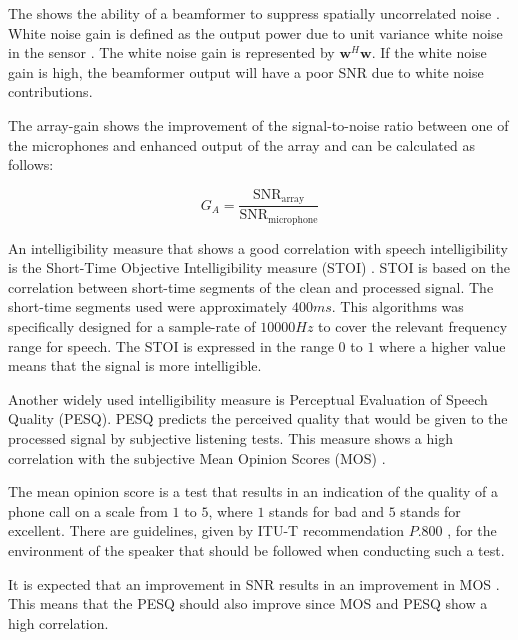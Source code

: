 The shows the ability of a beamformer to suppress spatially uncorrelated noise \cite{brandstein2001}. White noise gain is defined as the output power due to unit variance white noise in the sensor \cite{vanveen1988}.  The white noise gain is represented by $\textbf{w}^H\textbf{w}$. If the white noise gain is high, the beamformer output will have a poor SNR due to white noise contributions. 

The array-gain shows the improvement of the signal-to-noise ratio between one of the microphones and enhanced output of the array and can be calculated as follows:

\begin{equation}
G_{A} = \frac{\text{SNR}_\text{{array}}}{\text{SNR}_\text{microphone}}
\end{equation}


An intelligibility measure that shows a good correlation with speech intelligibility is the Short-Time Objective Intelligibility measure (STOI) \cite{taal2010, taal2011}. STOI is based on the correlation between short-time segments of the clean and processed signal. The short-time segments used were approximately $400 ms$. This algorithms was specifically designed for a sample-rate of $10000 Hz$ to cover the relevant frequency range for speech. The STOI is expressed in the range $0$ to $1$ where a higher value means that the signal is more intelligible.


Another widely used intelligibility measure is Perceptual Evaluation of Speech Quality (PESQ). PESQ predicts the perceived quality that would be given to the processed signal by subjective listening tests. This measure shows a high correlation with the subjective Mean Opinion Scores (MOS) \cite{rix2001, itu2010}.

The mean opinion score is a test that results in an indication of the quality of a phone call on a scale from $1$ to $5$, where $1$ stands for bad and $5$ stands for excellent. There are guidelines, given by ITU-T recommendation $P.800$ \cite{ituquality1998}, for the environment of the speaker that should be followed when conducting such a test.

It is expected that an improvement in SNR results in an improvement in MOS \cite{itumos1996}. This means that the PESQ should also improve since MOS and PESQ show a high correlation. 

